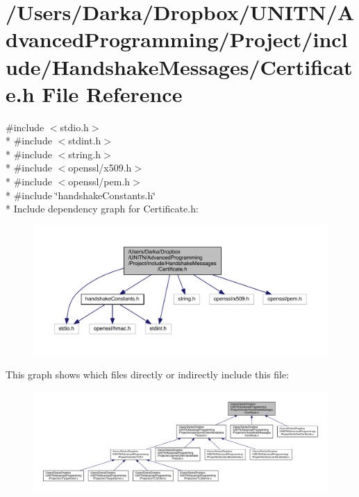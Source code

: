 \section{/\+Users/\+Darka/\+Dropbox/\+U\+N\+I\+T\+N/\+Advanced\+Programming/\+Project/include/\+Handshake\+Messages/\+Certificate.h File Reference}
\label{_certificate_8h}
{\ttfamily \#include $<$stdio.\+h$>$}\\*
{\ttfamily \#include $<$stdint.\+h$>$}\\*
{\ttfamily \#include $<$string.\+h$>$}\\*
{\ttfamily \#include $<$openssl/x509.\+h$>$}\\*
{\ttfamily \#include $<$openssl/pem.\+h$>$}\\*
{\ttfamily \#include \char`\"{}handshake\+Constants.\+h\char`\"{}}\\*
Include dependency graph for Certificate.\+h\+:\nopagebreak
\begin{figure}[H]
\begin{center}
\leavevmode
\includegraphics[width=350pt]{_certificate_8h__incl}
\end{center}
\end{figure}
This graph shows which files directly or indirectly include this file\+:\nopagebreak
\begin{figure}[H]
\begin{center}
\leavevmode
\includegraphics[width=350pt]{_certificate_8h__dep__incl}
\end{center}
\end{figure}
